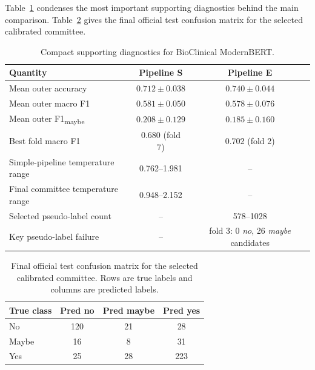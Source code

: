 \documentclass{article}
\begin{document}
Table~\ref{tab:bcb_result_diagnostics} condenses the most important supporting diagnostics behind the main comparison. Table~\ref{tab:bcb_final_confusion} gives the final official test confusion matrix for the selected calibrated committee.

\begin{table}[H]
\centering
\caption{Compact supporting diagnostics for BioClinical ModernBERT.}
\label{tab:bcb_result_diagnostics}
\small
\begin{tabular}{p{4.5cm}cc}
\hline
\textbf{Quantity} & \textbf{Pipeline S} & \textbf{Pipeline E} \\
\hline
Mean outer accuracy & $0.712\pm0.038$ & $0.740\pm0.044$ \\
Mean outer macro F1 & $\mathbf{0.581\pm0.050}$ & $0.578\pm0.076$ \\
Mean outer F1\textsubscript{maybe} & $\mathbf{0.208\pm0.129}$ & $0.185\pm0.160$ \\
Best fold macro F1 & 0.680 (fold 7) & 0.702 (fold 2) \\
Simple-pipeline temperature range & 0.762--1.981 & -- \\
Final committee temperature range & 0.948--2.152 & -- \\
Selected pseudo-label count & -- & 578--1028 \\
Key pseudo-label failure & -- & fold 3: 0 \textit{no}, 26 \textit{maybe} candidates \\
\hline
\end{tabular}
\end{table}

\begin{table}[H]
\centering
\caption{Final official test confusion matrix for the selected calibrated committee. Rows are true labels and columns are predicted labels.}
\label{tab:bcb_final_confusion}
\small
\begin{tabular}{lccc}
\hline
\textbf{True class} & \textbf{Pred no} & \textbf{Pred maybe} & \textbf{Pred yes} \\
\hline
No & 120 & 21 & 28 \\
Maybe & 16 & 8 & 31 \\
Yes & 25 & 28 & 223 \\
\hline
\end{tabular}
\end{table}
\end{document}
